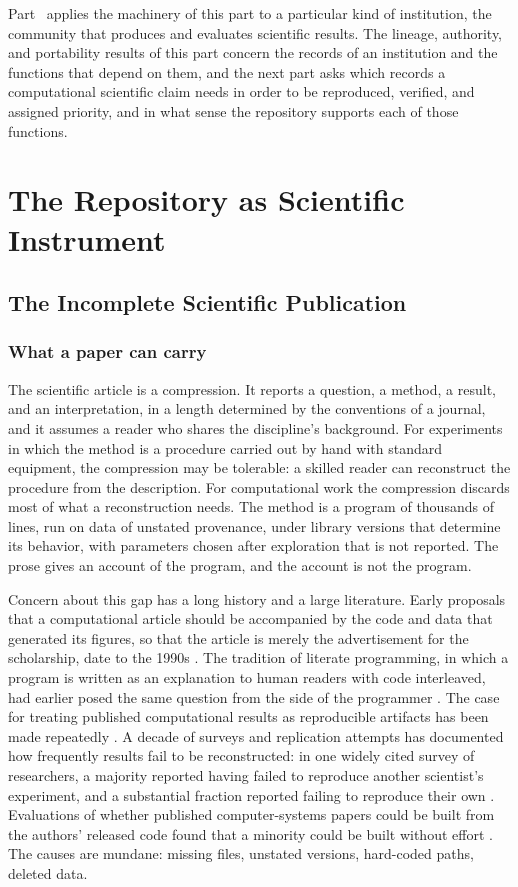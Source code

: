 \documentclass[11pt,twoside,openright]{book}
\theoremstyle{plain}
\theoremstyle{definition}
\theoremstyle{remark}
\begin{document}
Part~\ref{part:science} applies the machinery of this part to a particular kind of institution, the community that produces and evaluates scientific results. The lineage, authority, and portability results of this part concern the records of an institution and the functions that depend on them, and the next part asks which records a computational scientific claim needs in order to be reproduced, verified, and assigned priority, and in what sense the repository supports each of those functions.

\part{The Repository as Scientific Instrument}\label{part:science}

\chapter{The Incomplete Scientific Publication}\label{ch:incomplete}

\section{What a paper can carry}

The scientific article is a compression. It reports a question, a method, a result, and an interpretation, in a length determined by the conventions of a journal, and it assumes a reader who shares the discipline's background. For experiments in which the method is a procedure carried out by hand with standard equipment, the compression may be tolerable: a skilled reader can reconstruct the procedure from the description. For computational work the compression discards most of what a reconstruction needs. The method is a program of thousands of lines, run on data of unstated provenance, under library versions that determine its behavior, with parameters chosen after exploration that is not reported. The prose gives an account of the program, and the account is not the program.

Concern about this gap has a long history and a large literature. Early proposals that a computational article should be accompanied by the code and data that generated its figures, so that the article is merely the advertisement for the scholarship, date to the 1990s \cite{buckheit1995}. The tradition of literate programming, in which a program is written as an explanation to human readers with code interleaved, had earlier posed the same question from the side of the programmer \cite{knuth1984}. The case for treating published computational results as reproducible artifacts has been made repeatedly \cite{peng2011}. A decade of surveys and replication attempts has documented how frequently results fail to be reconstructed: in one widely cited survey of researchers, a majority reported having failed to reproduce another scientist's experiment, and a substantial fraction reported failing to reproduce their own \cite{baker2016}. Evaluations of whether published computer-systems papers could be built from the authors' released code found that a minority could be built without effort \cite{collberg2016}. The causes are mundane: missing files, unstated versions, hard-coded paths, deleted data.
\end{document}
